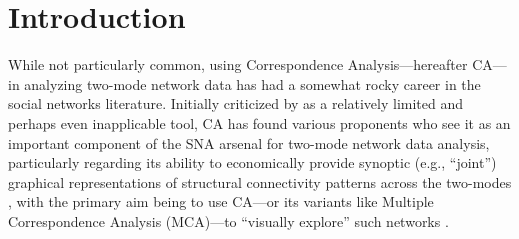 \documentclass[a4paper,fleqn]{cas-sc}
\begin{document}
\section{Introduction} \label{sec:intro}
While not particularly common, using Correspondence Analysis---hereafter CA---in analyzing two-mode network data has had a somewhat rocky career in the social networks literature. Initially criticized by \citet{borgatti1997network} as a relatively limited and perhaps even inapplicable tool, CA has found various proponents who see it as an important component of the SNA arsenal for two-mode network data analysis, particularly regarding its ability to economically provide synoptic (e.g., ``joint'') graphical representations of structural connectivity patterns across the two-modes \citep{roberts2000correspondence, breiger2000tool, faust2005using}, with the primary aim being to use CA---or its variants like Multiple Correspondence Analysis (MCA)---to ``visually explore'' such networks \citep{desposito2014use}. 

 
\end{document}
